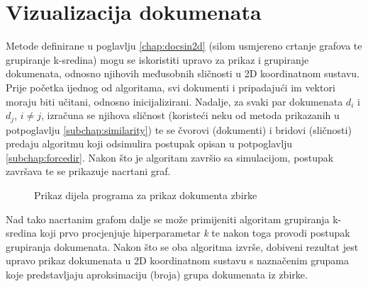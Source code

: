 \documentclass[times, utf8, zavrsni, numeric]{fer}
\begin{document}
\section{Vizualizacija dokumenata}
\label{sec:docdisplay}
Metode definirane u poglavlju \ref{chap:docsin2d} (silom usmjereno crtanje grafova te grupiranje k-sredina) mogu se iskoristiti upravo za prikaz i grupiranje dokumenata, odnosno njihovih međusobnih sličnosti u 2D koordinatnom sustavu. Prije početka ijednog od algoritama, svi dokumenti i pripadajući im vektori moraju biti učitani, odnosno inicijalizirani. Nadalje, za svaki par dokumenata $d_{i}$ i $d_{j}$, $i \neq j$, izračuna se njihova sličnost (koristeći neku od metoda prikazanih u potpoglavlju \ref{subchap:similarity}) te se čvorovi (dokumenti) i bridovi (sličnosti) predaju algoritmu koji odsimulira postupak opisan u potpoglavlju \ref{subchap:forcedir}. Nakon što je algoritam završio sa simulacijom, postupak završava te se prikazuje nacrtani graf.
\begin{figure}
\caption{Prikaz dijela programa za prikaz dokumenta zbirke}
\label{img:graph_program}
\end{figure}
Nad tako nacrtanim grafom dalje se može primijeniti algoritam grupiranja k-sredina koji prvo procjenjuje hiperparametar \textit{k} te nakon toga provodi postupak grupiranja dokumenata. Nakon što se oba algoritma izvrše, dobiveni rezultat jest upravo prikaz dokumenata u 2D koordinatnom sustavu s naznačenim grupama koje predstavljaju aproksimaciju (broja) grupa dokumenata iz zbirke. \par
\end{document}
